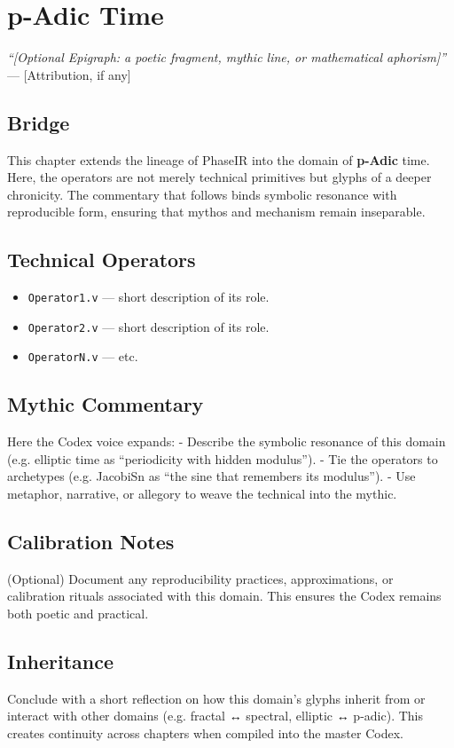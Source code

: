 \chapter{p-Adic Time}

\begin{flushright}
\textit{“[Optional Epigraph: a poetic fragment, mythic line, or mathematical aphorism]”} \\
— [Attribution, if any]
\end{flushright}

\section*{Bridge}
This chapter extends the lineage of PhaseIR into the domain of \textbf{p-Adic} time.  
Here, the operators are not merely technical primitives but glyphs of a deeper chronicity.  
The commentary that follows binds symbolic resonance with reproducible form, ensuring that  
mythos and mechanism remain inseparable.

\section{Technical Operators}
\begin{itemize}
  \item \texttt{Operator1.v} — short description of its role.
  \item \texttt{Operator2.v} — short description of its role.
  \item \texttt{OperatorN.v} — etc.
\end{itemize}

\section{Mythic Commentary}
Here the Codex voice expands:  
- Describe the symbolic resonance of this domain (e.g. elliptic time as “periodicity with hidden modulus”).  
- Tie the operators to archetypes (e.g. JacobiSn as “the sine that remembers its modulus”).  
- Use metaphor, narrative, or allegory to weave the technical into the mythic.  

\section{Calibration Notes}
(Optional) Document any reproducibility practices, approximations, or calibration rituals  
associated with this domain. This ensures the Codex remains both poetic and practical.

\section{Inheritance}
Conclude with a short reflection on how this domain’s glyphs inherit from or  
interact with other domains (e.g. fractal ↔ spectral, elliptic ↔ p-adic).  
This creates continuity across chapters when compiled into the master Codex.
